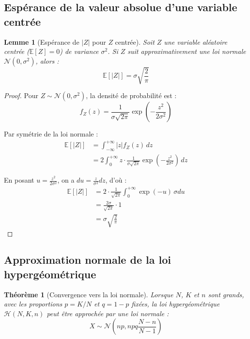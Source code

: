 \documentclass[11pt,a4paper]{article}
\newtheorem{theorem}{Théorème}
\newtheorem{lemma}{Lemme}
\theoremstyle{definition}
\theoremstyle{remark}
\begin{document}
\subsection{Espérance de la valeur absolue d'une variable centrée}

\begin{lemma}[Espérance de $|Z|$ pour $Z$ centrée]
Soit $Z$ une variable aléatoire centrée ($\mathbb{E}[Z] = 0$) de variance $\sigma^2$. Si $Z$ suit approximativement une loi normale $\mathcal{N}(0, \sigma^2)$, alors :
\begin{equation}
\mathbb{E}[|Z|] = \sigma \sqrt{\frac{2}{\pi}} \label{eq:esp_valabs}
\end{equation}
\end{lemma}

\begin{proof}
Pour $Z \sim \mathcal{N}(0, \sigma^2)$, la densité de probabilité est :
\[
f_Z(z) = \frac{1}{\sigma\sqrt{2\pi}} \exp\left(-\frac{z^2}{2\sigma^2}\right)
\]

Par symétrie de la loi normale :
\begin{align}
\mathbb{E}[|Z|] &= \int_{-\infty}^{+\infty} |z| f_Z(z) \, dz\\
&= 2\int_{0}^{+\infty} z \cdot \frac{1}{\sigma\sqrt{2\pi}} \exp\left(-\frac{z^2}{2\sigma^2}\right) \, dz
\end{align}

En posant $u = \frac{z^2}{2\sigma^2}$, on a $du = \frac{z}{\sigma^2} dz$, d'où :
\begin{align}
\mathbb{E}[|Z|] &= 2 \cdot \frac{1}{\sqrt{2\pi}} \int_{0}^{+\infty} \exp(-u) \, \sigma du\\
&= \frac{2\sigma}{\sqrt{2\pi}} \cdot 1\\
&= \sigma \sqrt{\frac{2}{\pi}}
\end{align}
\end{proof}

\subsection{Approximation normale de la loi hypergéométrique}

\begin{theorem}[Convergence vers la loi normale]
Lorsque $N$, $K$ et $n$ sont grands, avec les proportions $p = K/N$ et $q = 1-p$ fixées, la loi hypergéométrique $\mathcal{H}(N, K, n)$ peut être approchée par une loi normale :
\[
X \sim \mathcal{N}\left(np, npq\frac{N-n}{N-1}\right)
\]
\end{theorem}
\end{document}
